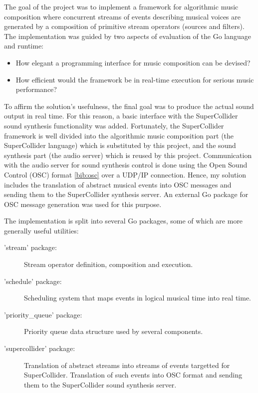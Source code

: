 \documentclass {article}
\begin{document}
The goal of the project was to implement a framework for algorithmic music
composition where concurrent streams of events describing musical voices are
generated by a composition of primitive stream operators (sources and filters).
The implementation was guided by two aspects of evaluation of the Go language
and runtime:

\begin{itemize}
\item How elegant a programming interface for music composition can be devised?
\item How efficient would the framework be in real-time execution for serious
music performance?
\end{itemize}

To affirm the solution's usefulness, the final goal was to produce the actual
sound output in real time. For this reason, a basic interface with the
SuperCollider sound synthesis functionality was added. Fortunately, the
SuperCollider framework is well divided into the algorithmic music composition
part (the SuperCollider language) which is substituted by this project, and the
sound synthesis part (the audio server) which is reused by this project.
Communication with the audio server for sound synthesis control is done using
the Open Sound Control (OSC) format \ref{bib:osc} over a UDP/IP connection.
Hence, my solution includes the translation of abstract musical events into OSC
messages and sending them to the SuperCollider synthesis server. An external Go
package for OSC message generation was used for this purpose.

The implementation is split into several Go packages, some of which are more
generally useful utilities:

\begin{description}
\item['stream' package:] Stream operator definition, composition and execution.
\item['schedule' package:] Scheduling system that maps events in logical musical
time into real time.
\item['priority\_queue' package:] Priority queue data structure used by several
components.
\item['supercollider' package:] Translation of abstract streams into streams of
events targetted for SuperCollider. Translation of such events into OSC format
and sending them to the SuperCollider sound synthesis server.
\end{description}
\end{document}

